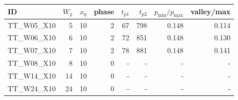 \begin{tabular}{lrrrrrrr}
\toprule
ID & $W_y$ & $x_0$ & phase & $t_{p1}$ & $t_{p2}$ & $p_{\min}/p_{\max}$ & valley/max \\
\midrule
TT\_W05\_X10 & 5 & 10 & 2 & 67 & 798 & 0.148 & 0.114 \\
TT\_W06\_X10 & 6 & 10 & 2 & 72 & 851 & 0.148 & 0.130 \\
TT\_W07\_X10 & 7 & 10 & 2 & 78 & 881 & 0.148 & 0.141 \\
TT\_W08\_X10 & 8 & 10 & 0 & - & - & - & - \\
TT\_W14\_X10 & 14 & 10 & 0 & - & - & - & - \\
TT\_W24\_X10 & 24 & 10 & 0 & - & - & - & - \\
\bottomrule
\end{tabular}
